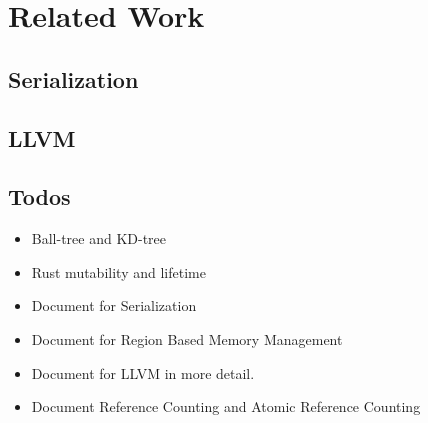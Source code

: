 \chapter{Related Work}
\label{chapter:relatedwork}
\thispagestyle{myheadings}

\graphicspath{{2_RelatedWork/Figures/}}

\label{sec:history}

\clearpage

\section{Serialization}
\label{sec:history}

\clearpage


\section{LLVM}
\label{sec:history}



\section{Todos}
\label{sec:history}
\begin{itemize}
    \item Ball-tree and KD-tree
    \item Rust mutability and lifetime
    \item Document for Serialization
    \item Document for Region Based Memory Management
    \item Document for LLVM in more detail.
    \item Document Reference Counting and Atomic Reference Counting
\end{itemize}




